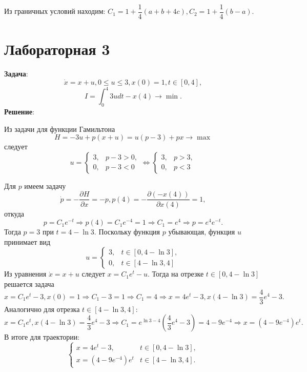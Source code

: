 \documentclass[a4paper, 12pt]{article}
\newcommand{\df}[2]{\frac{\partial #1}{\partial #2}}
\begin{document}
Из граничных условий находим: $C_1=1+\dfrac{1}{4}(a+b+4c),C_2 = 1+\dfrac{1}{4}(b-a)$.

\section{Лабораторная 3}
{\bf Задача}:
\begin{equation}
    \dot x = x+u , 0\leq u \leq 3, x(0)=1, t \in [0,4],
\end{equation}
\begin{equation}
    I=\int_0^4 3 u dt - x(4) \rightarrow \min.
\end{equation}
{\bf Решение}:

Из задачи для функции Гамильтона 
\begin{equation}
    H=-3u+p(x+u)=u(p-3)+px \rightarrow \max
\end{equation}
следует
\begin{equation}
    u=
    \begin{cases}
        3, & p-3 >0,\\
        0, & p-3<0
    \end{cases} 
    \Leftrightarrow
    \begin{cases}
        3, & p >3,\\
        0, & p<3
    \end{cases} 
\end{equation}

Для $p$ имеем задачу
\begin{equation}
    \dot p = - \df{H}{x}=-p,p(4)=-\df{(-x(4))}{x(4)}=1,
\end{equation}
откуда 
\begin{equation}
    p=C_1 e^{-t} \Rightarrow p(4) = C_1 e^{-4} = 1 \Rightarrow C_1=e^4 \Rightarrow p= e^4 e^{-t}.
\end{equation}
Тогда $p=3$ при $t=4-\ln 3$. Поскольку функция $p$ убывающая, функция $u$ принимает вид
\begin{equation}
    u=
    \begin{cases}
        3, & t \in [0,4-\ln 3],\\
        0, & t \in [4-\ln 3,4]
    \end{cases} 
\end{equation}
Из уравнения $\dot x = x +u$ следует $x=C_1 e^t -u$. Тогда на отрезке $t \in [0,4-\ln 3]$ решается задача
\begin{equation}
    x=C_1 e^t -3,x(0)=1 \Rightarrow C_1 -3 =1 \Rightarrow C_1=4 \Rightarrow x=4 e^t -3, x(4-\ln 3)=\dfrac{4}{3} e^4 -3.
\end{equation}
Аналогично для отрезка $t \in [4-\ln 3,4]$:
\begin{equation}
    x=C_1 e^t,x(4-\ln 3)=\dfrac{4}{3} e^4 -3 \Rightarrow C_1 = e^{\ln 3 - 4} \left(\dfrac{4}{3} e^4 -3  \right)=4- 9 e^{-4} \Rightarrow x=(4-9e^{-4})e^t.
\end{equation}
В итоге для траектории:
\begin{equation}
    \begin{cases}
        x=4 e^t -3, & t \in [0,4-\ln 3],\\
        x=(4-9e^{-4})e^t & t \in [4-\ln 3,4].
    \end{cases}
\end{equation}
\end{document}
